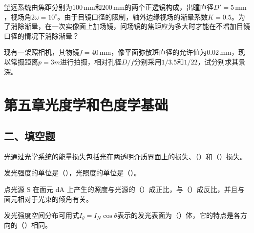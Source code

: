 \documentclass[padl, analysis, notocnum]{ExBook}
\newcommand{\answerarea}[1][3.5cm]{%
  \par\vspace{1mm}%
  \noindent{\color{themeColor!35}\rule{\linewidth}{0.4pt}}\par
  \noindent\begin{minipage}[t][#1][t]{\linewidth}\vspace{0pt}\end{minipage}\par
  \noindent{\color{themeColor!35}\rule{\linewidth}{0.4pt}}\par
}
\begin{document}
\begin{qitems}[startnum=8]
\qitem 望远系统由焦距分别为$100\,\mathrm{mm}$和$200\,\mathrm{mm}$的两个正透镜构成，出瞳直径$D'=5\,\mathrm{mm}$，视场角$2\omega =10^{\circ}$。由于目镜口径的限制，轴外边缘视场的渐晕系数$K=0.5$。为了消除渐晕，在一次实像面上加场镜，问场镜的焦距应为多大时才能在不增加目镜口径的情况下消除渐晕？
\label{q:91:start}
\answerarea[7.0cm]
\label{q:91:end}
\end{qitems}

\begin{qitems}[startnum=9]
\qitem 现有一架照相机，其物镜$f=40\,\mathrm{mm}$，像平面弥散斑直径的允许值为$0.02\,\mathrm{mm}$，现以常摄距离$p=3m$进行拍摄，相对孔径$D/f$分别采用$1/3.5$和$1/22$，试分别求其景深。
\label{q:92:start}
\answerarea[7.0cm]
\label{q:92:end}
\end{qitems}

\section{第五章\quad 光度学和色度学基础}
\subsection{二、填空题}
\begin{qitems}[startnum=1]
\qitem 光通过光学系统的能量损失包括光在两透明介质界面上的损失、（\hspace{1.6em}）和（\hspace{1.6em}）损失。
\label{q:93:start}
\answerarea[4.0cm]
\label{q:93:end}
\end{qitems}

\begin{qitems}[startnum=2]
\qitem 发光强度的单位是（\hspace{1.6em}），光照度的单位是（\hspace{1.6em}）。
\label{q:94:start}
\answerarea[4.0cm]
\label{q:94:end}
\end{qitems}

\begin{qitems}[startnum=3]
\qitem 点光源 S 在面元 dA 上产生的照度与光源的（\hspace{1.6em}）成正比，与（\hspace{1.6em}）成反比，并且与面元相对于光束的倾角有关。
\label{q:95:start}
\answerarea[4.0cm]
\label{q:95:end}
\end{qitems}

\begin{qitems}[startnum=4]
\qitem 发光强度空间分布可用式$I_{\theta}=I_{N}\cos \theta$表示的发光表面为（\hspace{1.6em}）体，它的特点是各方向的（\hspace{1.6em}）相同。
\label{q:96:start}
\answerarea[4.0cm]
\label{q:96:end}
\end{qitems}
\end{document}
